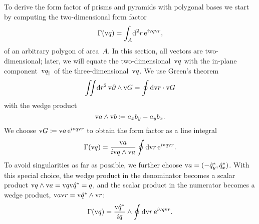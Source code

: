To derive the form factor of prisms and pyramids with polygonal bases
we start by computing the two-dimensional form factor
\begin{equation}\label{EFF_SFF2}
  \Gamma(\text{v}{q})=\int_A\!\text{d}^2r\, \text{e}^{i\text{v}{q}\text{v}{r}},
\end{equation}
of an arbitrary polygon of area~$A$.
In this section, all vectors are two-dimensional;
later, we will equate the two-dimensional~$\text{v}{q}$ with the in-plane
component~$\text{v}{q}_\parallel$ of the three-dimensional~$\text{v}{q}$.
We use Green's theorem
\begin{equation}
  \iint\!\text{d} r^2\,\text{v}{\partial}\wedge\text{v}{G} = \oint \text{d}\text{v}{r}\cdot\text{v}{G}
\end{equation}
with the wedge product
\begin{equation}
  \text{v}{a}\wedge\text{v}{b} \coloneqq
  a_xb_y - a_yb_x.
\end{equation}
We choose $\text{v}{G}\coloneqq\text{v}{a}\, \text{e}^{i\text{v}{q}\text{v}{r}}$
to obtain the form factor as a line integral
\begin{equation}
  \Gamma(\text{v}{q})=\frac{\text{v}{a}}{i \text{v}{q}\wedge\text{v}{a}} \oint \text{d}\text{v}{r}\,\text{e}^{i\text{v}{q}\text{v}{r}}.
\end{equation}
To avoid singularities as far as possible,
we further choose $\text{v}{a}=(-\hat q_y^*,\hat q_x^*)$.
With this special choice,
the wedge product in the denominator becomes a scalar product
$\text{v}{q}\wedge\text{v}{a}=\text{v}{q}\text{v}{\hat q^*}=q$, and
the scalar product in the numerator becomes a wedge product,
$\text{v}{a}\text{v}{r}=\text{v}{\hat q^*}\wedge\text{v}{r}$:
\begin{equation}
  \Gamma(\text{v}{q})=\frac{\text{v}{\hat q^*}}{iq}\wedge \oint \text{d}\text{v}{r}\,\text{e}^{i\text{v}{q}\text{v}{r}}.
\end{equation}


